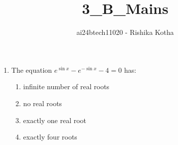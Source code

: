 \documentclass[journal,12pt,twocolumn]{IEEEtran}
\theoremstyle{remark}
\begin{document}

\vspace{3cm}

\title{3\_B\_Mains}
\author{ai24btech11020 - Rishika Kotha}

\maketitle
\bigskip       
\renewcommand{\thefigure}{\theenumi}
\renewcommand{\thetable}{\theenumi}

\begin{enumerate}[start=24]
\item The equation $e^{\sin x}-e^{-\sin x}-4=0$ has:
	\hfill {}
	\begin{enumerate}[label=\alph*.]
	\item  infinite number of real roots
	\item  no real roots
	\item  exactly one real root
	\item  exactly four roots
	\end{enumerate}


\end{enumerate}
\end{document}
